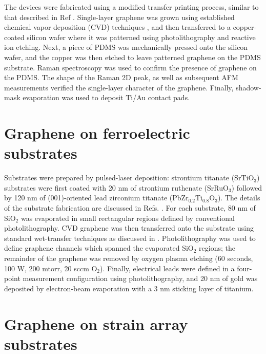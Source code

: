 \documentclass[edeposit,fullpage,draftthesis]{uiucthesis2009}
\begin{document}
\begin{appendices}
        The devices were fabricated using a modified transfer
        printing process, similar to that described in Ref \cite{Kim2009}.
        Single-layer graphene was grown using established chemical vapor deposition
        (CVD) techniques \cite{Li2009}, and then transferred to a copper-coated silicon
        wafer where it was patterned using photolithography and reactive ion etching.
        Next, a piece of PDMS was mechanically pressed onto the silicon wafer, and the
        copper was then etched to leave patterned graphene on the PDMS
        substrate\cite{Lee2010}. Raman spectroscopy was used to confirm the presence of
        graphene on the PDMS. The shape of the Raman 2D
        peak\cite{Ferrari2006}, as well as subsequent AFM measurements verified the
        single-layer character of the graphene. Finally, shadow-mask evaporation was
        used to deposit Ti/Au contact pads.

\section{Graphene on ferroelectric substrates}

Substrates were prepared by pulsed-laser deposition: strontium titanate (SrTiO$_3$) substrates were first coated with 20 nm of strontium ruthenate (SrRuO$_3$) followed by 120 nm of (001)-oriented lead zirconium titanate (PbZr$_{0.2}$Ti$_{0.8}$O$_3$). The details of the substrate fabrication are discussed in Refs. 
\cite{Xu2014,Karthik2012}.
For each substrate, 80 nm of SiO$_2$ was evaporated in small rectangular regions defined by conventional photolithography. CVD graphene was then transferred onto the substrate using standard wet-transfer techniques as discussed in \cite{Li2009}.
Photolithography was used to define graphene channels which spanned the evaporated SiO$_2$ regions; 
the remainder of the graphene was removed by oxygen plasma etching (60 seconds, 100 W, 200 mtorr, 20 sccm O$_2$). 
Finally, electrical leads were defined in a four-point measurement configuration using photolithography, and 20 nm of gold was deposited by electron-beam evaporation with a 3 nm sticking layer of titanium.

\section{Graphene on strain array substrates}


\end{appendices}
\end{document}
